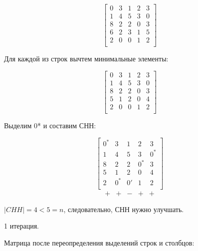 \documentclass[a4paper,14pt]{article}
\begin{document}
\begin{equation}
\begin{bmatrix}
     0  &   3  &   1  &   2  &   3\\
     1  &   4  &   5  &   3  &   0\\
     8  &   2  &   2  &   0  &   3\\
     6  &   2  &   3  &   1  &   5\\
     2  &   0  &   0  &   1  &   2\\
\end{bmatrix}
\end{equation}

Для каждой из строк вычтем минимальные элементы:

\begin{equation}
\begin{bmatrix}
     0  &   3  &   1  &   2  &   3\\
     1  &   4  &   5  &   3  &   0\\
     8  &   2  &   2  &   0  &   3\\
     5  &   1  &   2  &   0  &   4\\
     2  &   0  &   0  &   1  &   2\\
\end{bmatrix}
\end{equation}

Выделим 0* и составим СНН:

\begin{equation}
\begin{bmatrix}
0^* &	3 &		1  &	2   &	3 	 \\
1  &	4 &		5  &	3   &	0^*  \\
8  &	2 &		2  &	0^* & 	3 	 \\
5  &    1 &		2  &	0   &	4 	 \\
2  &	0^* &	0' &	1   &	2 	 \\
\end{bmatrix}
\end{equation}
\begin{equation}
\begin{matrix}
+ & + & - & + & +
\end{matrix}
\end{equation}

$|CHH| = 4 < 5 = n$, следовательно, СНН нужно улучшать.

1 итерация.

Матрица после переопределения выделений строк и столбцов:
\end{document}
